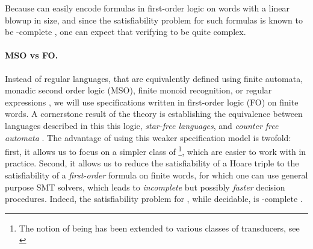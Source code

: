 Because  can easily encode formulas in first-order
logic on words with a linear blowup in size, and since the satisfiability
problem for such formulas is known to be \TOWER-complete \cite[Theorem
13.5]{REINH02}, one can expect that verifying  to be
quite complex.

\paragraph{MSO vs FO.} \AP Instead of regular languages, that are equivalently
defined using finite automata, monadic second order logic (MSO), finite monoid
recognition, or regular expressions \cite{buchi1960weak,KLEE56,TRAK66,SCHU61},
we will use specifications written in first-order logic (FO) on finite words.
A cornerstone result of the theory is establishing the equivalence between
languages described in this this logic, \emph{star-free languages}, and
\emph{counter free automata} \cite{PEPI86,SCHU65,MNPA71}. The advantage of
using this weaker specification model is twofold: first, it allows us to focus on
a simpler class of \footnote{
The notion of being  has been extended to various classes of
transducers, see \cite{CADA15,BDK18,MUSC19,bojanczyk2018polyregular}},
which are easier to work with in practice. Second, it allows us to reduce the
satisfiability of a Hoare triple to the satisfiability of a \emph{first-order}
formula on finite words, for which one can use general purpose SMT solvers, 
which leads to \emph{incomplete} but possibly \emph{faster} decision procedures.
Indeed, the satisfiability problem for , 
while decidable, is \TOWER-complete \cite[Theorem 13.5]{REINH02}. 

